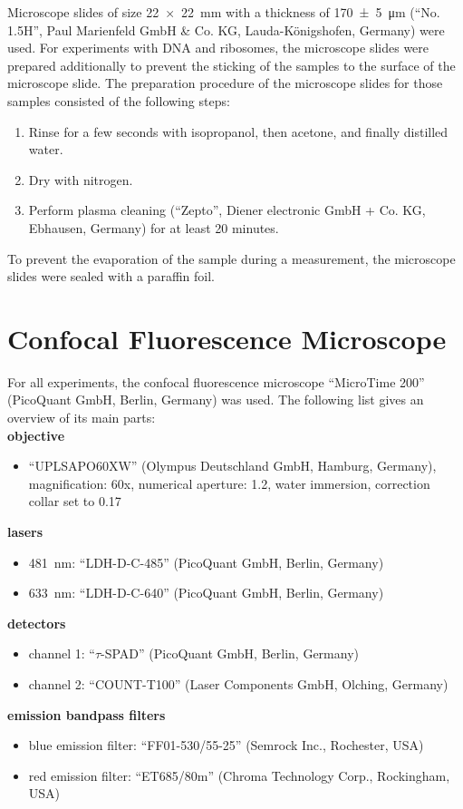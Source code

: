 Microscope slides of size \SI{22 x 22}{\milli\metre} with a thickness of \SI{170 +- 5}{\micro\metre} (\enquote{No. 1.5H}, Paul Marienfeld GmbH \& Co. KG, Lauda-Königshofen, Germany) were used. For experiments with DNA and ribosomes, the microscope slides were prepared additionally to prevent the sticking of the samples to the surface of the microscope slide. The preparation procedure of the microscope slides for those samples consisted of the following steps:

\begin{enumerate}
	\item Rinse for a few seconds with isopropanol, then acetone, and finally distilled water.
	\item Dry with nitrogen.
	\item Perform plasma cleaning (\enquote{Zepto}, Diener electronic GmbH + Co. KG, Ebhausen, Germany) for at least 20 minutes.
\end{enumerate}

To prevent the evaporation of the sample during a measurement, the microscope slides were sealed with a paraffin foil.

\section{Confocal Fluorescence Microscope}

For all experiments, the confocal fluorescence microscope \enquote{MicroTime 200} (PicoQuant GmbH, Berlin, Germany) was used. The following list gives an overview of its main parts:\\

\textbf{objective}
\begin{itemize}
	\item \enquote{UPLSAPO60XW} (Olympus Deutschland GmbH, Hamburg, Germany), magnification: \num{60}x, numerical aperture: \num{1.2}, water immersion, correction collar set to \num{0.17}
\end{itemize}
\newpage
\textbf{lasers}
\begin{itemize}
	\item \SI{481}{\nano\metre}: \enquote{LDH-D-C-485} (PicoQuant GmbH, Berlin, Germany) 
	\item \SI{633}{\nano\metre}: \enquote{LDH-D-C-640} (PicoQuant GmbH, Berlin, Germany) 
\end{itemize}
\textbf{detectors}
\begin{itemize}
	\item channel 1: \enquote{$\tau$-SPAD} (PicoQuant GmbH, Berlin, Germany)
	\item channel 2: \enquote{COUNT-T100} (Laser Components GmbH, Olching, Germany)
\end{itemize}
\textbf{emission bandpass filters}
\begin{itemize}
	\item blue emission filter: \enquote{FF01-530/55-25} (Semrock Inc., Rochester, USA)
	\item red emission filter: \enquote{ET685/80m} (Chroma Technology Corp., Rockingham, USA)
\end{itemize}

